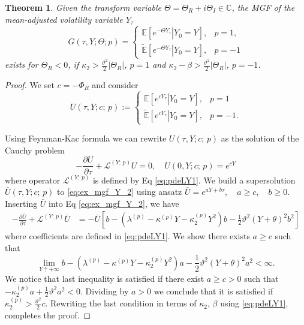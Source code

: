 \documentclass[pdftex,11pt,a4paper] {article}
\newtheorem{theorem}{Theorem}[section]
\begin{document}
\begin{theorem}\label{thm::existence_MGF_Y}
Given the transform variable $\Theta=\Theta_R+i\Theta_I\in \mathbb{C}$, the MGF of the mean-adjusted volatility variable $Y_\tau$
\begin{equation*}
G(\tau,Y;\Theta;p)=
\begin{cases}
\mathbb{E}[\left. e^{-\Theta Y_\tau}\right|Y_0=Y], & p=1,\\
\tilde{\mathbb{E}}[\left. e^{-\Theta Y_\tau}\right|Y_0=Y], & p=-1
\end{cases}
\end{equation*}
exists for $\Theta_R<0$, if $\kappa_2>\frac{\vartheta^2}{2}|\Theta_R|$, $p=1$ and $\kappa_2-\beta>\frac{\vartheta^2}{2}|\Theta_R|$, $p=-1$.
\end{theorem}
\begin{proof}
We set $c=-\Phi_R$ and consider
\begin{equation} \label{eq:mgf_Y_1}
U(\tau,Y; c;\,p) := 
\begin{cases}
\mathbb{E}[e^{cY_\tau}\left.\right|Y_0=Y], & p=1\\
\tilde{\mathbb{E}}[e^{cY_\tau}\left.\right|Y_0=Y], & p=-1.
\end{cases}
\end{equation}

Using Feynman-Kac formula we can rewrite $U(\tau,Y; c;\,p)$ as the solution of the Cauchy problem
\begin{equation}\label{eq:ex_mgf_Y_2}
-\frac{\partial U}{\partial\tau}+\mathcal{L}^{(Y;\,p)}U=0,\quad 
U(0,Y;c;\,p)=e^{cY}
\end{equation}
where operator $\mathcal{L}^{(Y;\,p)}$ is defined by Eq \eqref{eq:pdeLY1}.
We build a supersolution $\bar{U}(\tau,Y; c;\,p)$ to \eqref{eq:ex_mgf_Y_2} using ansatz  
$
\bar{U}=e^{aY+b\tau},\quad a\ge c, \quad b\ge 0
$. 
Inserting $\bar{U}$ into Eq \eqref{eq:ex_mgf_Y_2}, we have
\begin{equation}\label{eq:ex_mgf_Y_3}
\begin{split}
-\frac{\partial \bar{U}}{\partial\tau}+\mathcal{L}^{(Y;\,p)}\bar{U}&=
-\bar{U}\left[b-\left(\lambda^{(p)} - \kappa^{(p)} Y   - \kappa_{2}^{(p)}Y^{2}\right)b-\frac{1}{2} \vartheta^{2} (Y+\theta)^{2}b^2\right]
\end{split}
\end{equation}
where coefficients are defined in \eqref{eq:pdeLY1}. 
We show there exists $a\ge c$ such that
\begin{equation*}
\lim_{Y\uparrow+\infty}b-\left(\lambda^{(p)} - \kappa^{(p)} Y   - \kappa_{2}^{(p)}Y^{2}\right)a-\frac{1}{2} \vartheta^{2} (Y+\theta)^{2}a^2<\infty.
\end{equation*}
We notice that last inequality is satisfied if there exist $a\ge c>0$ such that
$
-\kappa_{2}^{(p)}a+\frac{1}{2} \vartheta^{2}a^2<0
$. 
Dividing by $a>0$ we conclude that it is satisfied if
$
\kappa_{2}^{(p)}>\frac{\vartheta^2}{2}c. 
$
Rewriting the last condition in terms of $\kappa_2$, $\beta$ using \eqref{eq:pdeLY1}, completes the proof.
\end{proof}
\end{document}
